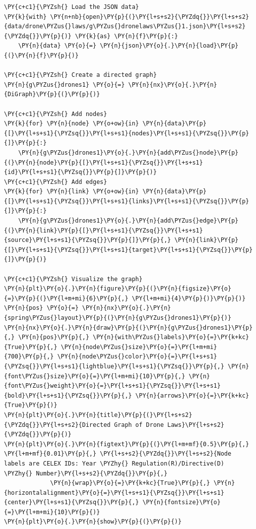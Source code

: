     \begin{tcolorbox}[breakable, size=fbox, boxrule=1pt, pad at break*=1mm,colback=cellbackground, colframe=cellborder]
\begin{Verbatim}[commandchars=\\\{\}]
\PY{c+c1}{\PYZsh{} Load the JSON data}
\PY{k}{with} \PY{n+nb}{open}\PY{p}{(}\PY{l+s+s2}{\PYZdq{}}\PY{l+s+s2}{data/drone\PYZus{}laws/g\PYZus{}dronelaws\PYZus{}1.json}\PY{l+s+s2}{\PYZdq{}}\PY{p}{)} \PY{k}{as} \PY{n}{f}\PY{p}{:}
    \PY{n}{data} \PY{o}{=} \PY{n}{json}\PY{o}{.}\PY{n}{load}\PY{p}{(}\PY{n}{f}\PY{p}{)}

\PY{c+c1}{\PYZsh{} Create a directed graph}
\PY{n}{g\PYZus{}drones1} \PY{o}{=} \PY{n}{nx}\PY{o}{.}\PY{n}{DiGraph}\PY{p}{(}\PY{p}{)}

\PY{c+c1}{\PYZsh{} Add nodes}
\PY{k}{for} \PY{n}{node} \PY{o+ow}{in} \PY{n}{data}\PY{p}{[}\PY{l+s+s1}{\PYZsq{}}\PY{l+s+s1}{nodes}\PY{l+s+s1}{\PYZsq{}}\PY{p}{]}\PY{p}{:}
    \PY{n}{g\PYZus{}drones1}\PY{o}{.}\PY{n}{add\PYZus{}node}\PY{p}{(}\PY{n}{node}\PY{p}{[}\PY{l+s+s1}{\PYZsq{}}\PY{l+s+s1}{id}\PY{l+s+s1}{\PYZsq{}}\PY{p}{]}\PY{p}{)}
\PY{c+c1}{\PYZsh{} Add edges}
\PY{k}{for} \PY{n}{link} \PY{o+ow}{in} \PY{n}{data}\PY{p}{[}\PY{l+s+s1}{\PYZsq{}}\PY{l+s+s1}{links}\PY{l+s+s1}{\PYZsq{}}\PY{p}{]}\PY{p}{:}
    \PY{n}{g\PYZus{}drones1}\PY{o}{.}\PY{n}{add\PYZus{}edge}\PY{p}{(}\PY{n}{link}\PY{p}{[}\PY{l+s+s1}{\PYZsq{}}\PY{l+s+s1}{source}\PY{l+s+s1}{\PYZsq{}}\PY{p}{]}\PY{p}{,} \PY{n}{link}\PY{p}{[}\PY{l+s+s1}{\PYZsq{}}\PY{l+s+s1}{target}\PY{l+s+s1}{\PYZsq{}}\PY{p}{]}\PY{p}{)}

\PY{c+c1}{\PYZsh{} Visualize the graph}
\PY{n}{plt}\PY{o}{.}\PY{n}{figure}\PY{p}{(}\PY{n}{figsize}\PY{o}{=}\PY{p}{(}\PY{l+m+mi}{6}\PY{p}{,} \PY{l+m+mi}{4}\PY{p}{)}\PY{p}{)}
\PY{n}{pos} \PY{o}{=} \PY{n}{nx}\PY{o}{.}\PY{n}{spring\PYZus{}layout}\PY{p}{(}\PY{n}{g\PYZus{}drones1}\PY{p}{)} 
\PY{n}{nx}\PY{o}{.}\PY{n}{draw}\PY{p}{(}\PY{n}{g\PYZus{}drones1}\PY{p}{,} \PY{n}{pos}\PY{p}{,} \PY{n}{with\PYZus{}labels}\PY{o}{=}\PY{k+kc}{True}\PY{p}{,} \PY{n}{node\PYZus{}size}\PY{o}{=}\PY{l+m+mi}{700}\PY{p}{,} \PY{n}{node\PYZus{}color}\PY{o}{=}\PY{l+s+s1}{\PYZsq{}}\PY{l+s+s1}{lightblue}\PY{l+s+s1}{\PYZsq{}}\PY{p}{,} \PY{n}{font\PYZus{}size}\PY{o}{=}\PY{l+m+mi}{10}\PY{p}{,} \PY{n}{font\PYZus{}weight}\PY{o}{=}\PY{l+s+s1}{\PYZsq{}}\PY{l+s+s1}{bold}\PY{l+s+s1}{\PYZsq{}}\PY{p}{,} \PY{n}{arrows}\PY{o}{=}\PY{k+kc}{True}\PY{p}{)}
\PY{n}{plt}\PY{o}{.}\PY{n}{title}\PY{p}{(}\PY{l+s+s2}{\PYZdq{}}\PY{l+s+s2}{Directed Graph of Drone Laws}\PY{l+s+s2}{\PYZdq{}}\PY{p}{)}
\PY{n}{plt}\PY{o}{.}\PY{n}{figtext}\PY{p}{(}\PY{l+m+mf}{0.5}\PY{p}{,} \PY{l+m+mf}{0.01}\PY{p}{,} \PY{l+s+s2}{\PYZdq{}}\PY{l+s+s2}{Node labels are CELEX IDs: Year \PYZhy{} Regulation(R)/Directive(D) \PYZhy{} Number}\PY{l+s+s2}{\PYZdq{}}\PY{p}{,} 
             \PY{n}{wrap}\PY{o}{=}\PY{k+kc}{True}\PY{p}{,} \PY{n}{horizontalalignment}\PY{o}{=}\PY{l+s+s1}{\PYZsq{}}\PY{l+s+s1}{center}\PY{l+s+s1}{\PYZsq{}}\PY{p}{,} \PY{n}{fontsize}\PY{o}{=}\PY{l+m+mi}{10}\PY{p}{)}
\PY{n}{plt}\PY{o}{.}\PY{n}{show}\PY{p}{(}\PY{p}{)}
\end{Verbatim}
\end{tcolorbox}

